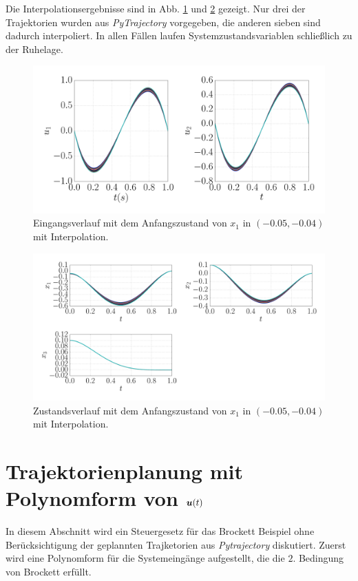 Die Interpolationsergebnisse sind in Abb. \ref{fig:Brockett_e2_interpolation_u} und \ref{fig:Brockett_e2_interpolation_x} gezeigt. Nur drei der Trajektorien wurden aus \emph{PyTrajectory} vorgegeben, die anderen sieben sind dadurch interpoliert. In allen Fällen laufen Systemzustandsvariablen schließlich zu der Ruhelage. 
\begin{figure}[!h]
	\centering
	\includegraphics[width=0.8\linewidth]{bild/30_32/Brockett_e2_interpolation_u.pdf}%
	\caption{Eingangsverlauf mit dem Anfangszustand von $x_{1}$ in $(-0.05,-0.04)$ mit Interpolation.}
	\label{fig:Brockett_e2_interpolation_u}
\end{figure} 

\begin{figure}[!h]
	\centering
	\includegraphics[width=\linewidth]{bild/30_32/Brockett_e2_interpolation_x.pdf}%
	\caption{Zustandsverlauf mit dem Anfangszustand von $x_{1}$ in $(-0.05,-0.04)$ mit Interpolation.}
	\label{fig:Brockett_e2_interpolation_x}
\end{figure} 
 
\section{Trajektorienplanung mit Polynomform von $\boldsymbol u(t)$}
In diesem Abschnitt wird ein Steuergesetz für das Brockett Beispiel ohne Berücksichtigung der geplannten Trajketorien aus \emph{Pytrajectory} diskutiert. Zuerst wird eine Polynomform für die Systemeingänge aufgestellt, die die $2$. Bedingung von Brockett erfüllt.

